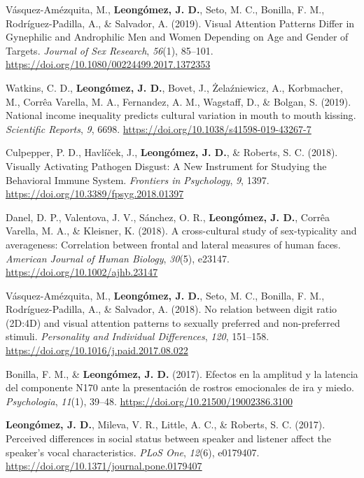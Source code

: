 \documentclass[11pt, a4paper]{awesome-cv}
\begin{document}
\leavevmode\hypertarget{ref-Vasquez-Amezquita2017}{}%
Vásquez-Amézquita, M., \textbf{Leongómez, J. D.}, Seto, M. C., Bonilla,
F. M., Rodríguez-Padilla, A., \& Salvador, A. (2019). {Visual Attention
Patterns Differ in Gynephilic and Androphilic Men and Women Depending on
Age and Gender of Targets}. \emph{Journal of Sex Research},
\emph{56}(1), 85--101.
\url{https://doi.org/10.1080/00224499.2017.1372353}

\leavevmode\hypertarget{ref-Watkins2019}{}%
Watkins, C. D., \textbf{Leongómez, J. D.}, Bovet, J., Żelaźniewicz, A.,
Korbmacher, M., Corrêa Varella, M. A., Fernandez, A. M., Wagstaff, D.,
\& Bolgan, S. (2019). {National income inequality predicts cultural
variation in mouth to mouth kissing}. \emph{Scientific Reports},
\emph{9}, 6698. \url{https://doi.org/10.1038/s41598-019-43267-7}

\leavevmode\hypertarget{ref-Culpepper2018}{}%
Culpepper, P. D., Havlíček, J., \textbf{Leongómez, J. D.}, \& Roberts,
S. C. (2018). {Visually Activating Pathogen Disgust: A New Instrument
for Studying the Behavioral Immune System}. \emph{Frontiers in
Psychology}, \emph{9}, 1397.
\url{https://doi.org/10.3389/fpsyg.2018.01397}

\leavevmode\hypertarget{ref-Danel2017}{}%
Danel, D. P., Valentova, J. V., Sánchez, O. R.,
\textbf{Leongómez, J. D.}, Corrêa Varella, M. A., \& Kleisner, K.
(2018). {A cross-cultural study of sex-typicality and averageness:
Correlation between frontal and lateral measures of human faces}.
\emph{American Journal of Human Biology}, \emph{30}(5), e23147.
\url{https://doi.org/10.1002/ajhb.23147}

\leavevmode\hypertarget{ref-Vasquez-Amezquita2018}{}%
Vásquez-Amézquita, M., \textbf{Leongómez, J. D.}, Seto, M. C., Bonilla,
F. M., Rodríguez-Padilla, A., \& Salvador, A. (2018). {No relation
between digit ratio (2D:4D) and visual attention patterns to sexually
preferred and non-preferred stimuli}. \emph{Personality and Individual
Differences}, \emph{120}, 151--158.
\url{https://doi.org/10.1016/j.paid.2017.08.022}

\leavevmode\hypertarget{ref-BonillaCarreno2017}{}%
Bonilla, F. M., \& \textbf{Leongómez, J. D.} (2017). {Efectos en la
amplitud y la latencia del componente N170 ante la presentaci{ó}n de
rostros emocionales de ira y miedo}. \emph{Psychologia}, \emph{11}(1),
39--48. \url{https://doi.org/10.21500/19002386.3100}

\leavevmode\hypertarget{ref-Leongomez2017}{}%
\textbf{Leongómez, J. D.}, Mileva, V. R., Little, A. C., \& Roberts, S.
C. (2017). {Perceived differences in social status between speaker and
listener affect the speaker's vocal characteristics}. \emph{PLoS One},
\emph{12}(6), e0179407.
\url{https://doi.org/10.1371/journal.pone.0179407}
\end{document}
